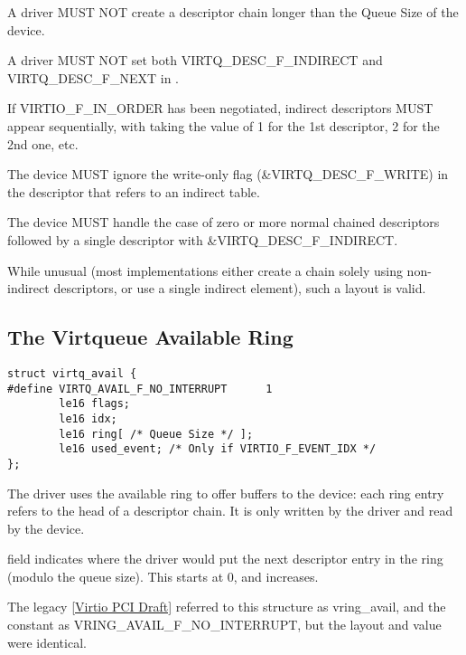 A driver MUST NOT create a descriptor chain longer than the Queue Size of
the device.

A driver MUST NOT set both VIRTQ_DESC_F_INDIRECT and VIRTQ_DESC_F_NEXT
in .

If VIRTIO_F_IN_ORDER has been negotiated, indirect descriptors
MUST appear sequentially, with  taking the value
of 1 for the 1st descriptor, 2 for the 2nd one, etc.

The device MUST ignore the write-only flag (\&VIRTQ_DESC_F_WRITE) in the descriptor that refers to an indirect table.

The device MUST handle the case of zero or more normal chained
descriptors followed by a single descriptor with \&VIRTQ_DESC_F_INDIRECT.

\begin{note}
While unusual (most implementations either create a chain solely using
non-indirect descriptors, or use a single indirect element), such a
layout is valid.
\end{note}

\subsection{The Virtqueue Available Ring}\label{sec:Basic Facilities of a Virtio Device / Virtqueues / The Virtqueue Available Ring}

\begin{lstlisting}
struct virtq_avail {
#define VIRTQ_AVAIL_F_NO_INTERRUPT      1
        le16 flags;
        le16 idx;
        le16 ring[ /* Queue Size */ ];
        le16 used_event; /* Only if VIRTIO_F_EVENT_IDX */
};
\end{lstlisting}

The driver uses the available ring to offer buffers to the
device: each ring entry refers to the head of a descriptor chain.  It is only
written by the driver and read by the device.

 field indicates where the driver would put the next descriptor
entry in the ring (modulo the queue size). This starts at 0, and increases.

\begin{note}
The legacy \hyperref[intro:Virtio PCI Draft]{[Virtio PCI Draft]}
referred to this structure as vring_avail, and the constant as
VRING_AVAIL_F_NO_INTERRUPT, but the layout and value were identical.
\end{note}

